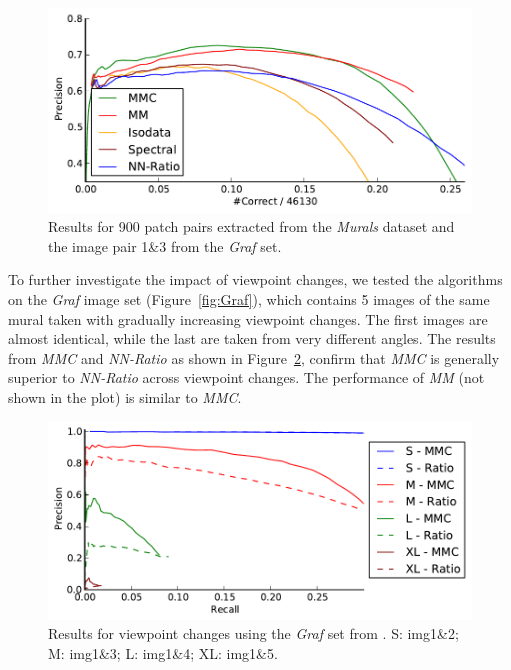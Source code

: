 \documentclass[conference]{IEEEtran}
\begin{document}
\begin{figure}[htb]
	\centering
    \includegraphics[width=0.9\columnwidth]{images/result_accumulated}
	\caption{Results for 900 patch pairs extracted from the 
    \emph{Murals} dataset and the image pair 1\&3 from the \emph{Graf} 
    set.}
	\label{fig:result_accumulated}
\end{figure}

To further investigate the impact of viewpoint changes, we tested the 
algorithms on the \emph{Graf} image set (Figure~\ref{fig:Graf}), which 
contains 5 images of the same mural taken with gradually increasing 
viewpoint changes.  The first images are almost identical, while the 
last are taken from very different angles. The results from   \emph{MMC} 
and \emph{NN-Ratio} as shown in Figure~\ref{fig:result_viewpoint}, 
confirm that \emph{MMC} is generally superior to \emph{NN-Ratio} across 
viewpoint changes. The performance of \emph{MM} (not shown in the plot) 
is similar to \emph{MMC}.

\begin{figure}[htb]
	\centering
    \includegraphics[width=0.9\columnwidth]{images/result_viewpoint}
	\caption{Results for viewpoint changes using the \emph{Graf} set from 
		\cite{mikolajczyk2005performance}.  S: img1\&2; M: img1\&3; L: img1\&4; XL: img1\&5.}
	\label{fig:result_viewpoint}
\end{figure}
\end{document}
